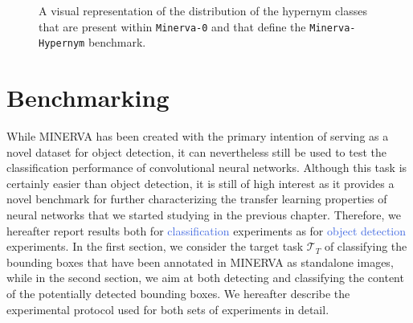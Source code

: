 \begin{figure}[htb!]
	
	\caption{A visual representation of the distribution of the hypernym classes that are present within \texttt{Minerva-0} and that define the \texttt{Minerva-Hypernym} benchmark.}
	\label{fig:hypernym_distribution}
\end{figure}


\section{Benchmarking}
\label{sec:benchmarking}

While MINERVA has been created with the primary intention of serving as a novel dataset for object detection, it can nevertheless still be used to test the classification performance of convolutional neural networks. Although this task is certainly easier than object detection, it is still of high interest as it provides a novel benchmark for further characterizing the transfer learning properties of neural networks that we started studying in the previous chapter. Therefore, we hereafter report results both for \textcolor{RoyalBlue}{classification} experiments as for \textcolor{RoyalBlue}{object detection} experiments. In the first section, we consider the target task $\mathcal{T}_T$ of classifying the bounding boxes that have been annotated in MINERVA as standalone images, while in the second section, we aim at both detecting and classifying the content of the potentially detected bounding boxes. We hereafter describe the experimental protocol used for both sets of experiments in detail.

